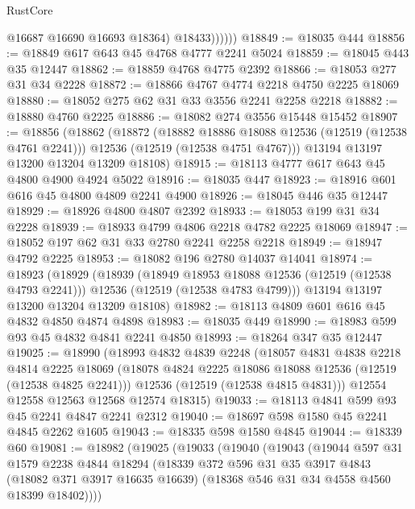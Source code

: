 \begin{lexlean}{RustCore}
\begin{coremodule}
                  @16687
                  @16690
                  @16693
                  @18364)
                @18433))))))
@18849 := @18035 @444
@18856 := @18849 @617 @643 @45 @4768 @4777 @2241 @5024
@18859 := @18045 @443 @35 @12447
@18862 := @18859 @4768 @4775 @2392
@18866 := @18053 @277 @31 @34 @2228
@18872 := @18866 @4767 @4774 @2218 @4750 @2225 @18069
@18880 := @18052 @275 @62 @31 @33 @3556 @2241 @2258 @2218
@18882 := @18880 @4760 @2225
@18886 := @18082 @274 @3556 @15448 @15452
@18907 := @18856
    (@18862
      (@18872
        (@18882 @18886 @18088 @12536 (@12519 (@12538 @4761 @2241)))
        @12536
        (@12519 (@12538 @4751 @4767)))
      @13194
      @13197
      @13200
      @13204
      @13209
      @18108)
@18915 := @18113 @4777 @617 @643 @45 @4800 @4900 @4924 @5022
@18916 := @18035 @447
@18923 := @18916 @601 @616 @45 @4800 @4809 @2241 @4900
@18926 := @18045 @446 @35 @12447
@18929 := @18926 @4800 @4807 @2392
@18933 := @18053 @199 @31 @34 @2228
@18939 := @18933 @4799 @4806 @2218 @4782 @2225 @18069
@18947 := @18052 @197 @62 @31 @33 @2780 @2241 @2258 @2218
@18949 := @18947 @4792 @2225
@18953 := @18082 @196 @2780 @14037 @14041
@18974 := @18923
    (@18929
      (@18939
        (@18949 @18953 @18088 @12536 (@12519 (@12538 @4793 @2241)))
        @12536
        (@12519 (@12538 @4783 @4799)))
      @13194
      @13197
      @13200
      @13204
      @13209
      @18108)
@18982 := @18113 @4809 @601 @616 @45 @4832 @4850 @4874 @4898
@18983 := @18035 @449
@18990 := @18983 @599 @93 @45 @4832 @4841 @2241 @4850
@18993 := @18264 @347 @35 @12447
@19025 := @18990
    (@18993
      @4832
      @4839
      @2248
      (@18057
        @4831
        @4838
        @2218
        @4814
        @2225
        @18069
        (@18078 @4824 @2225 @18086 @18088 @12536 (@12519 (@12538 @4825 @2241)))
        @12536
        (@12519 (@12538 @4815 @4831)))
      @12554
      @12558
      @12563
      @12568
      @12574
      @18315)
@19033 := @18113 @4841 @599 @93 @45 @2241 @4847 @2241 @2312
@19040 := @18697 @598 @1580 @45 @2241 @4845 @2262 @1605
@19043 := @18335 @598 @1580 @4845
@19044 := @18339 @60
@19081 := @18982
    (@19025
      (@19033
        (@19040
          (@19043
            (@19044
              @597
              @31
              @1579
              @2238
              @4844
              @18294
              (@18339
                @372
                @596
                @31
                @35
                @3917
                @4843
                (@18082 @371 @3917 @16635 @16639)
                (@18368 @546 @31 @34 @4558 @4560 @18399 @18402))))

\end{coremodule}
\end{lexlean}
